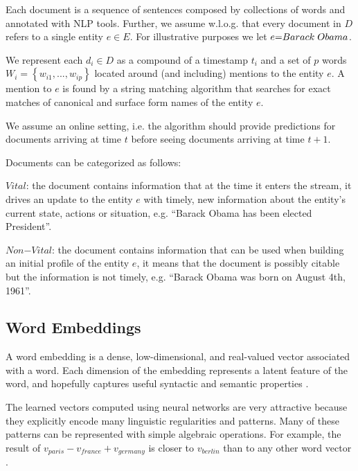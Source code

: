 \documentclass{article}
\begin{document}
Each document is a sequence of sentences composed by collections of words and annotated with NLP tools.
Further, we assume w.l.o.g. that every document in $D$ refers to a single entity $e \in E$. For illustrative purposes we let $e\mathord{=}Barack\hspace{1mm}Obama$.

We represent each $d_i \in D$ as a compound of a timestamp $t_i$ and a set of $p$ words $W_i = \left\{ {w_{i1}, ..., w_{ip}}\right\}$ located around (and including) mentions to the entity $e$. A mention to $e$ is found by a string matching algorithm that searches for exact matches of canonical and surface form names of the entity $e$.

We assume an online setting, i.e. the algorithm should provide predictions for documents arriving at time $t$ before seeing documents arriving at time $t+1$.

Documents can be categorized as follows:

\begin{itemize*}
    \item $Vital$: the document contains information that at the time it enters the stream, it drives an update to the entity $e$ with timely, new information about the entity's current state, actions or situation, e.g. ``Barack Obama has been elected President''.
    \item $Non\mathord{-}Vital$: the document contains information that can be used when building an initial profile of the entity $e$, it means that the document is possibly citable but the information is not timely, e.g. ``Barack Obama was born on August 4th, 1961''.
\end{itemize*}

\subsection{Word Embeddings}
\label{emb}

A word embedding is a dense, low-dimensional, and real-valued vector associated with a word. Each dimension of the embedding represents a latent feature of the word, and hopefully captures useful syntactic and semantic properties \cite{Turian10wordrepresentations}.

The learned vectors computed using neural networks are very attractive because they explicitly encode many linguistic regularities and patterns. Many of these patterns can be represented with simple algebraic operations. For example, the result of $v_{paris} - v_{france} + v_{germany}$ is closer to $v_{berlin}$ than to any other word vector \cite{mikolovChen,mikolovYih}.
\end{document}
